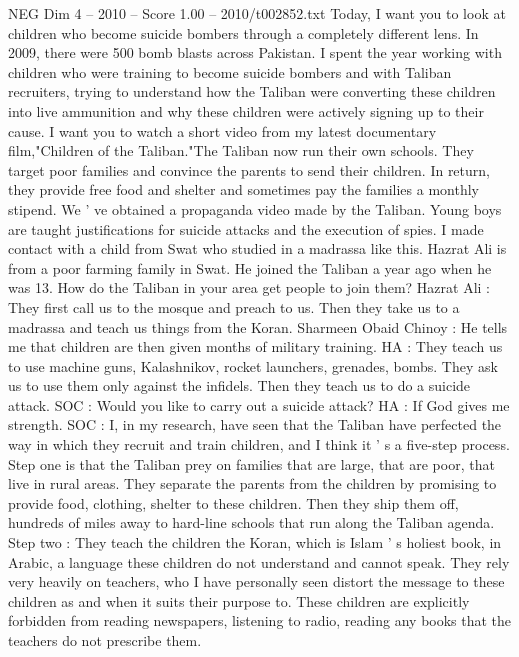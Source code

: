 \begin{textsample}{NEG Dim 4 – 2010 – Score 1.00 – 2010/t002852.txt}  \label{ex:f4_neg_023}
Today, I want you to look at children who become suicide bombers through a completely different lens.
In 2009, there were 500 bomb blasts across Pakistan.
I spent the year working with children who were training to become suicide bombers and with Taliban recruiters, trying to understand how the Taliban were converting these children into live ammunition and why these children were actively signing up to their cause.
I want you to watch a short video from my latest documentary film,"Children of the Taliban."The Taliban now run their own schools.
They target poor families and convince the parents to send their children.
In return, they provide free food and shelter and sometimes pay the families a monthly stipend.
We ' ve obtained a propaganda video made by the Taliban.
Young boys are taught justifications for suicide attacks and the execution of spies.
I made contact with a child from Swat who studied in a madrassa like this.
Hazrat Ali is from a poor farming family in Swat.
He joined the Taliban a year ago when he was 13.
How do the Taliban in your area get people to join them?
Hazrat Ali : They first call us to the mosque and preach to us.
Then they take us to a madrassa and teach us things from the Koran.
Sharmeen Obaid Chinoy : He tells me that children are then given months of military training.
HA : They teach us to use machine guns, Kalashnikov, rocket launchers, grenades, bombs.
They ask us to use them only against the infidels.
Then they teach us to do a suicide attack.
SOC : Would you like to carry out a suicide attack?
HA : If God gives me strength.
SOC : I, in my research, have seen that the Taliban have perfected the way in which they recruit and train children, and I think it ' s a five-step process.
Step one is that the Taliban prey on families that are large, that are poor, that live in rural areas.
They separate the parents from the children by promising to provide food, clothing, shelter to these children.
Then they ship them off, hundreds of miles away to hard-line schools that run along the Taliban agenda.
Step two : They teach the children the Koran, which is Islam ' s holiest book, in Arabic, a language these children do not understand and cannot speak.
They rely very heavily on teachers, who I have personally seen distort the message to these children as and when it suits their purpose to.
These children are explicitly forbidden from reading newspapers, listening to radio, reading any books that the teachers do not prescribe them.

\end{textsample}

